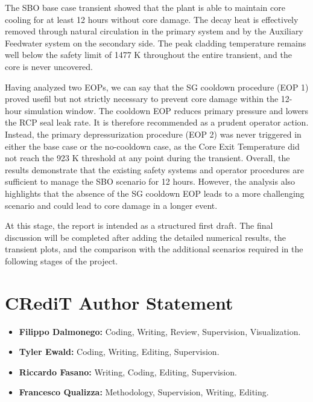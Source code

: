 \documentclass[a4paper,11pt]{article}
\numberwithin{subsubsection}{subsection}
\numberwithin{subsection}{section}
\begin{document}
The SBO base case transient showed that the plant is able to maintain core cooling for at least 12 hours without core damage. The decay heat is effectively removed through natural circulation in the primary system and by the Auxiliary Feedwater system on the secondary side. The peak cladding temperature remains well below the safety limit of 1477 K throughout the entire transient, and the core is never uncovered.

Having analyzed two EOPs, we can say that the SG cooldown procedure (EOP 1) proved usefil but not strictly necessary to prevent core damage within the 12-hour simulation window. The cooldown EOP reduces primary pressure and lowers the RCP seal leak rate. It is therefore recommended as a prudent operator action. Instead, the primary depressurization procedure (EOP 2) was never triggered in either the base case or the no-cooldown case, as the Core Exit Temperature did not reach the 923 K threshold at any point during the transient. 
Overall, the results demonstrate that the existing safety systems and operator procedures are sufficient to manage the SBO scenario for 12 hours. However, the analysis also highlights that the absence of the SG cooldown EOP leads to a more challenging scenario and could lead to core damage in a longer event.

At this stage, the report is intended as a structured first draft. The final discussion will be completed after adding the detailed numerical results, the transient plots, and the comparison with the additional scenarios required in the following stages of the project.

\newpage

\section*{CRediT Author Statement}

\begin{itemize}
    \item \textbf{Filippo Dalmonego:} Coding, Writing, Review, Supervision, Visualization.
    \item \textbf{Tyler Ewald:} Coding, Writing, Editing, Supervision.
    \item \textbf{Riccardo Fasano:} Writing, Coding, Editing, Supervision.
    \item \textbf{Francesco Qualizza:} Methodology, Supervision, Writing, Editing.
\end{itemize}
\end{document}
